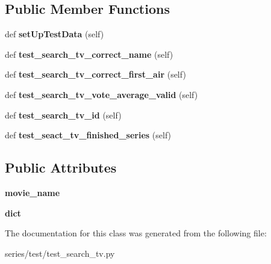 \subsection*{Public Member Functions}
\begin{DoxyCompactItemize}
\item 
\mbox{\label{classseries_1_1test_1_1test__search__tv_1_1_search_tv_test_a7c5105c4904e7fe5b746b0632e3211af}} 
def {\bfseries set\+Up\+Test\+Data} (self)
\item 
\mbox{\label{classseries_1_1test_1_1test__search__tv_1_1_search_tv_test_ac2d310495eb9812cf23d128fcdc6b690}} 
def {\bfseries test\+\_\+search\+\_\+tv\+\_\+correct\+\_\+name} (self)
\item 
\mbox{\label{classseries_1_1test_1_1test__search__tv_1_1_search_tv_test_abdc1be748f1fd32c697afd0565c7e97a}} 
def {\bfseries test\+\_\+search\+\_\+tv\+\_\+correct\+\_\+first\+\_\+air} (self)
\item 
\mbox{\label{classseries_1_1test_1_1test__search__tv_1_1_search_tv_test_a4d0f7d7a699461a2fed1eae8098516d1}} 
def {\bfseries test\+\_\+search\+\_\+tv\+\_\+vote\+\_\+average\+\_\+valid} (self)
\item 
\mbox{\label{classseries_1_1test_1_1test__search__tv_1_1_search_tv_test_ac009e811798e9221d1052482a316a53f}} 
def {\bfseries test\+\_\+search\+\_\+tv\+\_\+id} (self)
\item 
\mbox{\label{classseries_1_1test_1_1test__search__tv_1_1_search_tv_test_a8333242b008a0b9b679951769ac1234d}} 
def {\bfseries test\+\_\+seact\+\_\+tv\+\_\+finished\+\_\+series} (self)
\end{DoxyCompactItemize}
\subsection*{Public Attributes}
\begin{DoxyCompactItemize}
\item 
\mbox{\label{classseries_1_1test_1_1test__search__tv_1_1_search_tv_test_a65a1aa35abeda5cd6175ee7cad49dc26}} 
{\bfseries movie\+\_\+name}
\item 
\mbox{\label{classseries_1_1test_1_1test__search__tv_1_1_search_tv_test_a37b6763da82679e4b14cab1fbaf0d373}} 
{\bfseries dict}
\end{DoxyCompactItemize}


The documentation for this class was generated from the following file\+:\begin{DoxyCompactItemize}
\item 
series/test/test\+\_\+search\+\_\+tv.\+py\end{DoxyCompactItemize}

